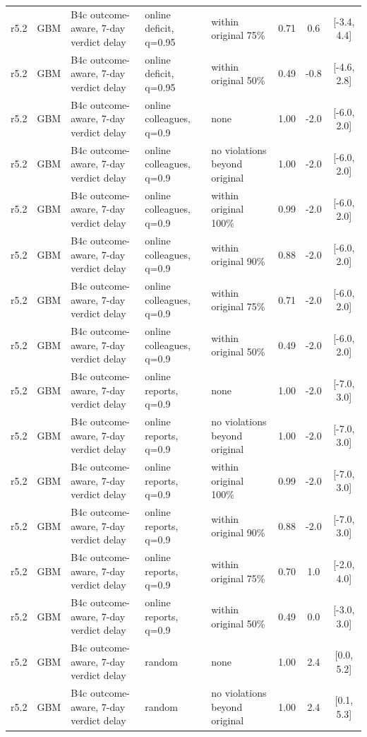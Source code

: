 \documentclass[10pt,onecolumn,letterpaper]{article}
\begin{document}
\begin{longtable}{lllp{4.2cm}p{3.4cm}ccc}
r5.2 & GBM & B4c outcome-aware, 7-day verdict delay & online deficit, q=0.95 & within original 75\% & 0.71 & 0.6 & [-3.4, 4.4] \\
r5.2 & GBM & B4c outcome-aware, 7-day verdict delay & online deficit, q=0.95 & within original 50\% & 0.49 & -0.8 & [-4.6, 2.8] \\
r5.2 & GBM & B4c outcome-aware, 7-day verdict delay & online colleagues, q=0.9 & none & 1.00 & -2.0 & [-6.0, 2.0] \\
r5.2 & GBM & B4c outcome-aware, 7-day verdict delay & online colleagues, q=0.9 & no violations beyond original & 1.00 & -2.0 & [-6.0, 2.0] \\
r5.2 & GBM & B4c outcome-aware, 7-day verdict delay & online colleagues, q=0.9 & within original 100\% & 0.99 & -2.0 & [-6.0, 2.0] \\
r5.2 & GBM & B4c outcome-aware, 7-day verdict delay & online colleagues, q=0.9 & within original 90\% & 0.88 & -2.0 & [-6.0, 2.0] \\
r5.2 & GBM & B4c outcome-aware, 7-day verdict delay & online colleagues, q=0.9 & within original 75\% & 0.71 & -2.0 & [-6.0, 2.0] \\
r5.2 & GBM & B4c outcome-aware, 7-day verdict delay & online colleagues, q=0.9 & within original 50\% & 0.49 & -2.0 & [-6.0, 2.0] \\
r5.2 & GBM & B4c outcome-aware, 7-day verdict delay & online reports, q=0.9 & none & 1.00 & -2.0 & [-7.0, 3.0] \\
r5.2 & GBM & B4c outcome-aware, 7-day verdict delay & online reports, q=0.9 & no violations beyond original & 1.00 & -2.0 & [-7.0, 3.0] \\
r5.2 & GBM & B4c outcome-aware, 7-day verdict delay & online reports, q=0.9 & within original 100\% & 0.99 & -2.0 & [-7.0, 3.0] \\
r5.2 & GBM & B4c outcome-aware, 7-day verdict delay & online reports, q=0.9 & within original 90\% & 0.88 & -2.0 & [-7.0, 3.0] \\
r5.2 & GBM & B4c outcome-aware, 7-day verdict delay & online reports, q=0.9 & within original 75\% & 0.70 & 1.0 & [-2.0, 4.0] \\
r5.2 & GBM & B4c outcome-aware, 7-day verdict delay & online reports, q=0.9 & within original 50\% & 0.49 & 0.0 & [-3.0, 3.0] \\
r5.2 & GBM & B4c outcome-aware, 7-day verdict delay & random & none & 1.00 & 2.4 & [0.0, 5.2] \\
r5.2 & GBM & B4c outcome-aware, 7-day verdict delay & random & no violations beyond original & 1.00 & 2.4 & [0.1, 5.3] \\

\end{longtable}
\end{document}
